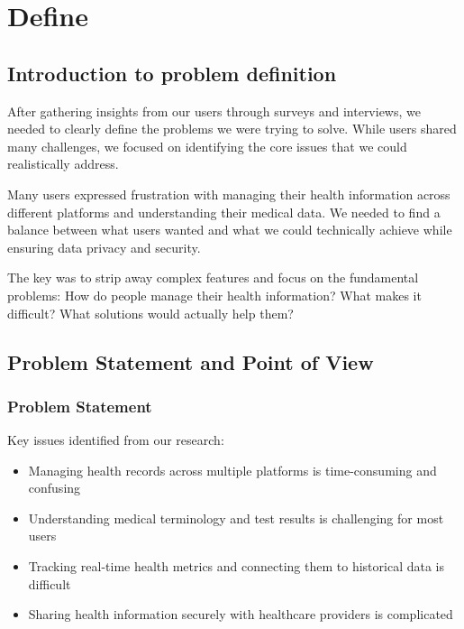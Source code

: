 \pagestyle{fancy}
\thispagestyle{fancy}
\chapter{Define}
\section{Introduction to problem definition}

After gathering insights from our users through surveys and interviews, we needed to clearly define the problems we were trying to solve. While users shared many challenges, we focused on identifying the core issues that we could realistically address.

Many users expressed frustration with managing their health information across different platforms and understanding their medical data. We needed to find a balance between what users wanted and what we could technically achieve while ensuring data privacy and security.

The key was to strip away complex features and focus on the fundamental problems: How do people manage their health information? What makes it difficult? What solutions would actually help them?

\section{Problem Statement and Point of View}

\subsection{Problem Statement}
Key issues identified from our research:
\begin{itemize}
    \item Managing health records across multiple platforms is time-consuming and confusing
    \item Understanding medical terminology and test results is challenging for most users
    \item Tracking real-time health metrics and connecting them to historical data is difficult
    \item Sharing health information securely with healthcare providers is complicated
\end{itemize}

